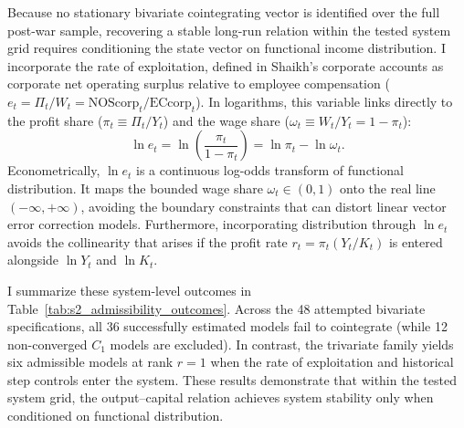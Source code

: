 Because no stationary bivariate cointegrating vector is identified over the full post-war sample, recovering a stable long-run relation within the tested system grid requires conditioning the state vector on functional income distribution. I incorporate the rate of exploitation, defined in Shaikh's corporate accounts as corporate net operating surplus relative to employee compensation ($e_t = \Pi_t / W_t = \text{NOScorp}_t / \text{ECcorp}_t$). In logarithms, this variable links directly to the profit share ($\pi_t \equiv \Pi_t / Y_t$) and the wage share ($\omega_t \equiv W_t / Y_t = 1 - \pi_t$):
\begin{equation}
\label{eq:exploitation_log_odds}
\ln e_t = \ln \left( \frac{\pi_t}{1 - \pi_t} \right) = \ln \pi_t - \ln \omega_t.
\end{equation}
Econometrically, $\ln e_t$ is a continuous log-odds transform of functional distribution. It maps the bounded wage share $\omega_t \in (0, 1)$ onto the real line $(-\infty, +\infty)$, avoiding the boundary constraints that can distort linear vector error correction models. Furthermore, incorporating distribution through $\ln e_t$ avoids the collinearity that arises if the profit rate $r_t = \pi_t (Y_t / K_t)$ is entered alongside $\ln Y_t$ and $\ln K_t$.

I summarize these system-level outcomes in Table~\ref{tab:s2_admissibility_outcomes}. Across the 48 attempted bivariate specifications, all 36 successfully estimated models fail to cointegrate (while 12 non-converged $C_1$ models are excluded). In contrast, the trivariate family yields six admissible models at rank $r=1$ when the rate of exploitation and historical step controls enter the system. These results demonstrate that within the tested system grid, the output--capital relation achieves system stability only when conditioned on functional distribution.

